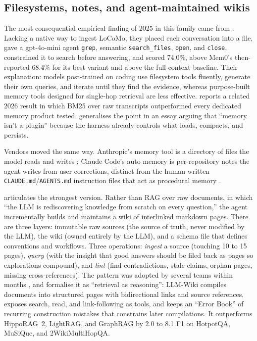 \documentclass[11pt]{article}
\begin{document}
\subsection{Filesystems, notes, and agent-maintained wikis}
\label{sec:filesystems}

The most consequential empirical finding of 2025 in this family came from \citet{letta2025filesystem}. Lacking a native way to ingest LoCoMo, they placed each conversation into a file, gave a gpt-4o-mini agent \texttt{grep}, semantic \texttt{search\_files}, \texttt{open}, and \texttt{close}, constrained it to search before answering, and scored 74.0\%, above Mem0's then-reported 68.4\% for its best variant and above the full-context baseline. Their explanation: models post-trained on coding use filesystem tools fluently, generate their own queries, and iterate until they find the evidence, whereas purpose-built memory tools designed for single-hop retrieval are less effective. \citet{kumar2026agentmemory} reports a related 2026 result in which BM25 over raw transcripts outperformed every dedicated memory product tested. \citet{wooders2026plugin} generalises the point in an essay arguing that ``memory isn't a plugin'' because the harness already controls what loads, compacts, and persists.

Vendors moved the same way. Anthropic's memory tool is a directory of files the model reads and writes \citep{anthropic2025memorytool}; Claude Code's auto memory is per-repository notes the agent writes from user corrections, distinct from the human-written \texttt{CLAUDE.md}/\texttt{AGENTS.md} instruction files that act as procedural memory \citep{anthropic2026claudecode}.

\citet{karpathy2026wiki} articulates the strongest version. Rather than RAG over raw documents, in which ``the LLM is rediscovering knowledge from scratch on every question,'' the agent incrementally builds and maintains a wiki of interlinked markdown pages. There are three layers: immutable raw sources (the source of truth, never modified by the LLM), the wiki (owned entirely by the LLM), and a schema file that defines conventions and workflows. Three operations: \emph{ingest} a source (touching 10 to 15 pages), \emph{query} (with the insight that good answers should be filed back as pages so explorations compound), and \emph{lint} (find contradictions, stale claims, orphan pages, missing cross-references). The pattern was adopted by several teams within months \citep{mem0_2026wikis,akita2026}, and \citet{ming2026llmwiki} formalise it as ``retrieval as reasoning'': LLM-Wiki compiles documents into structured pages with bidirectional links and source references, exposes search, read, and link-following as tools, and keeps an ``Error Book'' of recurring construction mistakes that constrains later compilations. It outperforms HippoRAG~2, LightRAG, and GraphRAG by 2.0 to 8.1 F1 on HotpotQA, MuSiQue, and 2WikiMultiHopQA.
\end{document}
